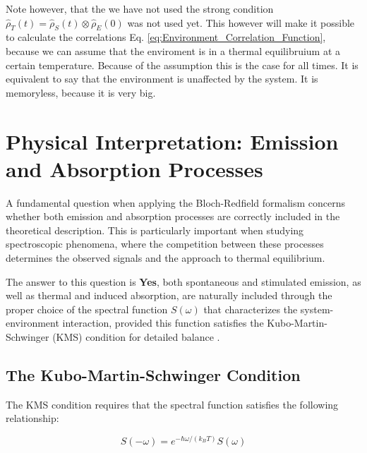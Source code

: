 Note however, that the we have not used the strong condition $\hat{\rho}_T(t) = \hat{\rho}_S(t) \otimes \hat{\rho}_E(0)$ was not used yet.
This however will make it possible to calculate the correlations Eq. \eqref{eq:Environment_Correlation_Function}, because we can assume that the enviroment is in a thermal equilibruium at a certain temperature.
Because of the assumption this is the case for all times.
It is equivalent to say that the environment is unaffected by the system. It is memoryless, because it is very big.


\section{Physical Interpretation: Emission and Absorption Processes}
\label{sec:emission_absorption_kms}

\noindent A fundamental question when applying the Bloch-Redfield formalism concerns whether both emission and absorption processes are correctly included in the theoretical description. This is particularly important when studying spectroscopic phenomena, where the competition between these processes determines the observed signals and the approach to thermal equilibrium.

\noindent The answer to this question is \textbf{Yes}, both spontaneous and stimulated emission, as well as thermal and induced absorption, are naturally included through the proper choice of the spectral function $S(\omega)$ that characterizes the system-environment interaction, provided this function satisfies the Kubo-Martin-Schwinger (KMS) condition for detailed balance \cite{Kubo1957, Martin1959, Schwinger1961}.

\subsection{The Kubo-Martin-Schwinger Condition}
\label{subsec:kms_condition}

\noindent The KMS condition requires that the spectral function satisfies the following relationship:

\begin{equation}
	S(-\omega) = e^{-\hbar\omega/(k_B T)} S(\omega)
	\label{eq:kms_condition}
\end{equation}

